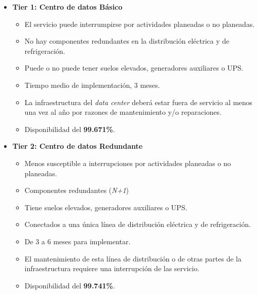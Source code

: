       \begin{itemize}
          \item \textbf{Tier 1: Centro de datos Básico} 
            \begin{itemize}
                \item El servicio puede interrumpirse por actividades planeadas o no planeadas.
                \item No hay componentes redundantes en la distribución eléctrica y de refrigeración.
                \item Puede o no puede tener suelos elevados, generadores auxiliares o UPS.
                \item Tiempo medio de implementación, 3 meses.
                \item La infraestructura del \textit{data center} deberá estar fuera de servicio al menos una vez al año por razones de mantenimiento y/o reparaciones.
                \item Disponibilidad del \textbf{99.671\%}.
            \end{itemize}

          \item \textbf{Tier 2: Centro de datos Redundante}
            \begin{itemize}
                \item  Menos susceptible a interrupciones por actividades planeadas o no planeadas.
                \item  Componentes redundantes (\textit{N+1})
                \item  Tiene suelos elevados, generadores auxiliares o UPS.
                \item  Conectados a una única línea de distribución eléctrica y de refrigeración.
                \item  De 3 a 6 meses para implementar.
                \item  El mantenimiento de esta línea de distribución o de otras partes de la infraestructura requiere una interrupción de las servicio.
                \item Disponibilidad del \textbf{99.741\%}.
            \end{itemize}



\end{itemize}
